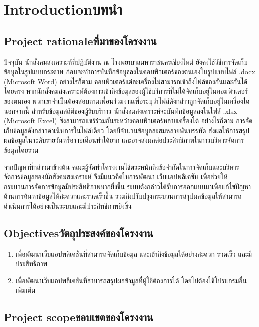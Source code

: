 \chapter{\ifenglish Introduction\else บทนำ\fi}

\section{\ifenglish Project rationale\else ที่มาของโครงงาน\fi}

ปัจจุบัน นักสังคมสงเคราะห์ที่ปฏิบัติงาน ณ โรงพยาบาลมหาราชนครเชียงใหม่ ยังคงใช้วิธีการจัดเก็บข้อมูลในรูปแบบกระดาษ ก่อนจะทำการบันทึกข้อมูลลงในคอมพิวเตอร์ของตนเองในรูปแบบไฟล์ .docx (Microsoft Word) อย่างไรก็ตาม คอมพิวเตอร์แต่ละเครื่องไม่สามารถเข้าถึงไฟล์ของกันและกันได้โดยตรง หากนักสังคมสงเคราะห์ต้องการเข้าถึงข้อมูลของผู้ใช้บริการที่ไม่ได้จัดเก็บอยู่ในคอมพิวเตอร์ของตนเอง พวกเขาจำเป็นต้องสอบถามเพื่อนร่วมงานเพื่อระบุว่าไฟล์ดังกล่าวถูกจัดเก็บอยู่ในเครื่องใด
นอกจากนี้ สำหรับข้อมูลสถิติของผู้รับบริการ นักสังคมสงเคราะห์จะบันทึกข้อมูลลงในไฟล์ .xlsx (Microsoft Excel) ซึ่งสามารถแชร์ร่วมกันระหว่างคอมพิวเตอร์หลายเครื่องได้ อย่างไรก็ตาม การจัดเก็บข้อมูลดังกล่าวดำเนินการในไฟล์เดียว โดยมีจำนวนข้อมูลสะสมหลายพันบรรทัด ส่งผลให้การสรุปผลข้อมูลในระดับรายวันหรือรายเดือนทำได้ยาก และอาจส่งผลต่อประสิทธิภาพในการบริหารจัดการข้อมูลโดยรวม

จากปัญหาที่กล่าวมาข้างต้น คณะผู้จัดทำโครงงานได้ตระหนักถึงข้อจำกัดในการจัดเก็บและบริหารจัดการข้อมูลของนักสังคมสงเคราะห์ จึงมีแนวคิดในการพัฒนา เว็บแอปพลิเคชัน เพื่อช่วยให้กระบวนการจัดการข้อมูลมีประสิทธิภาพมากยิ่งขึ้น ระบบดังกล่าวได้รับการออกแบบมาเพื่อแก้ไขปัญหาด้านการค้นหาข้อมูลให้สะดวกและรวดเร็วขึ้น รวมถึงปรับปรุงกระบวนการสรุปผลข้อมูลให้สามารถดำเนินการได้อย่างเป็นระบบและมีประสิทธิภาพยิ่งขึ้น

\section{\ifenglish Objectives\else วัตถุประสงค์ของโครงงาน\fi}
\begin{enumerate}
    \item เพื่อพัฒนาเว็บแอปพลิเคชันที่สามารถจัดเก็บข้อมูล และเข้าถึงข้อมูลได้อย่างสะดวก รวดเร็ว และมีประสิทธิภาพ
    \item เพื่อพัฒนาเว็บแอปพลิเคชันที่สามารถสรุปผลข้อมูลที่ผู้ใช้ต้องการได้ โดยไม่ต้องใช้โปรแกรมอื่นเพิ่มเติม
\end{enumerate}

\section{\ifenglish Project scope\else ขอบเขตของโครงงาน\fi}

